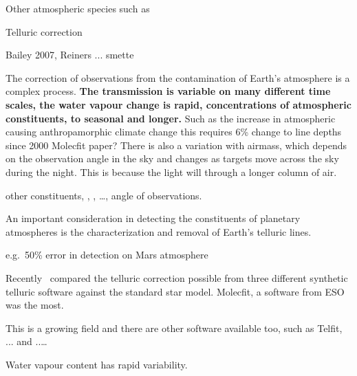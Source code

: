 Other atmospheric species such as 


Telluric correction

Bailey 2007, Reiners ... smette 




The correction of observations from the contamination of Earth's atmosphere is a complex process.\textbf{
    The transmission is variable on many different time scales, the water vapour change is rapid, concentrations of atmospheric constituents, to seasonal and longer.}
Such as the increase in atmospheric  causing anthropamorphic climate change this requires 6\% change to  line depths since 2000 Molecfit paper?
There is also a variation with airmass, which depends on the observation angle in the sky and changes as targets move across the sky during the night. This is because the light will through a longer column of air.

other constituents, , ,  \ldots{}, angle of observations.

An important consideration in detecting the constituents of planetary atmospheres is the characterization and removal of Earth's telluric lines.

e.g.\ 50\% error in  detection on Mars atmosphere


Recently~\citet{ulmer-moll_telluric_2018} compared the telluric correction possible from three different synthetic telluric software against the standard star model.
Molecfit, a software from ESO was the most.

This is a growing field and there are other software available too, such as Telfit, ... and ..\ldots{}


Water vapour content has rapid variability.




